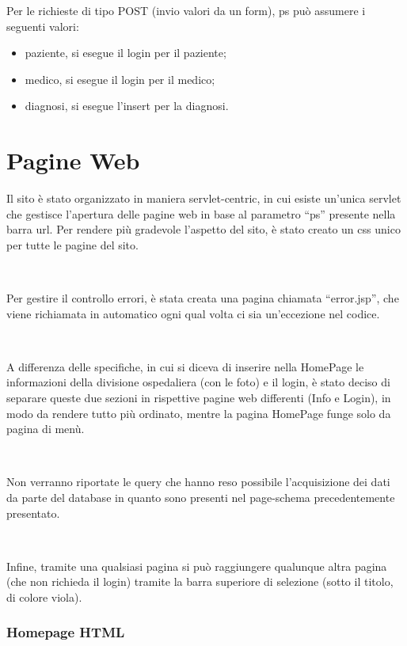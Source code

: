 \documentclass[a4paper,titlepage]{article}
\begin{document}
Per le richieste di tipo POST (invio valori da un form), ps può assumere i seguenti valori:

\begin{itemize}[leftmargin=0.5cm, topsep=0.25cm, itemsep=0.2cm]

\item paziente, si esegue il login per il paziente;

\item medico, si esegue il login per il medico;

\item diagnosi, si esegue l'insert per la diagnosi.

\end{itemize}

\part{Pagine Web}

Il sito è stato organizzato in maniera servlet-centric, in cui esiste un'unica servlet che gestisce l'apertura delle pagine web in base al parametro ``ps'' presente nella barra url. Per rendere più gradevole l'aspetto del sito, è stato creato un css unico per tutte le pagine del sito.

~

Per gestire il controllo errori, è stata creata una pagina chiamata ``error.jsp'', che viene richiamata in automatico ogni qual volta ci sia un'eccezione nel codice.

~

A differenza delle specifiche, in cui si diceva di inserire nella HomePage le informazioni della divisione ospedaliera (con le foto) e il login, è stato deciso di separare queste due sezioni in rispettive pagine web differenti (Info e Login), in modo da rendere tutto più ordinato, mentre la pagina HomePage funge solo da pagina di menù.

~

Non verranno riportate le query che hanno reso possibile l'acquisizione dei dati da parte del database in quanto sono presenti nel page-schema precedentemente presentato.

~

Infine, tramite una qualsiasi pagina si può raggiungere qualunque altra pagina (che non richieda il login) tramite la barra superiore di selezione (sotto il titolo, di colore viola).

\section{Homepage HTML}
\end{document}
